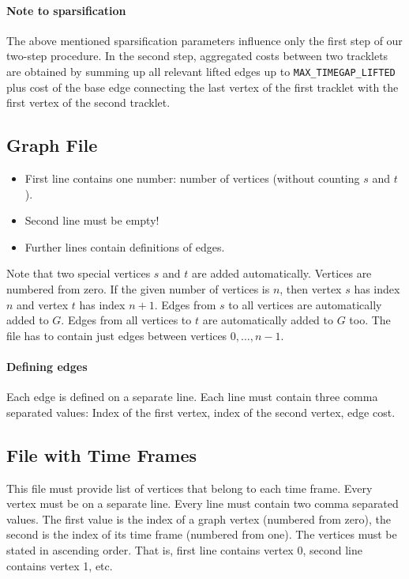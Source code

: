 \documentclass[a4paper,10pt]{article}
\begin{document}
\paragraph{Note to sparsification}
The above mentioned sparsification parameters influence only the first step of our two-step procedure. In the second step, aggregated costs between two tracklets are obtained by summing up all relevant lifted edges up to \texttt{MAX\_TIMEGAP\_LIFTED} plus cost of the base edge connecting the last vertex of the first tracklet with the first vertex of the second tracklet. 




\subsection{Graph File}
\begin{itemize}
	\item First line contains one number: number of vertices (without counting $s$ and $t$).
	\item Second line must be empty!
	\item Further lines contain definitions of edges. 
	
\end{itemize}

Note that two special vertices $s$ and $t$ are added automatically. Vertices are numbered from zero. If the given number of vertices is $n$, then vertex $s$ has index $n$ and vertex $t$ has index $n+1$. Edges from $s$ to all vertices are automatically added to $G$. Edges from all vertices to $t$ are automatically added  to $G$ too. The file has to contain just edges between vertices $0,\dots, n-1$. 

\paragraph{Defining edges }Each edge is defined on a separate line. Each line must contain three comma separated values: Index of the first vertex, index of the second vertex, edge cost.

\subsection{File with Time Frames}
This file must provide list of vertices that belong to each time frame. Every vertex must be on a separate line. Every line must contain two comma separated values. The first value is the index of a graph vertex (numbered from zero), the second is the index of its time frame (numbered from one). The vertices must be stated in ascending order. That is, first line contains vertex 0, second line contains vertex 1, etc.
\end{document}

